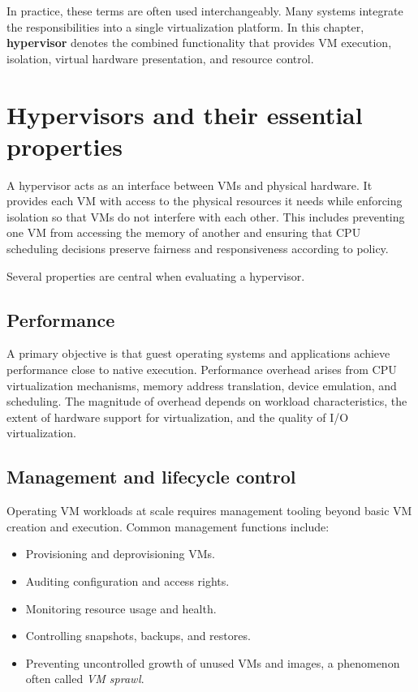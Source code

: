 \documentclass[11pt,a4paper,openany]{report}
\begin{document}
In practice, these terms are often used interchangeably. Many systems integrate the responsibilities into a single virtualization platform. In this chapter, \textbf{hypervisor} denotes the combined functionality that provides VM execution, isolation, virtual hardware presentation, and resource control.

\section{Hypervisors and their essential properties}

A hypervisor acts as an interface between VMs and physical hardware. It provides each VM with access to the physical resources it needs while enforcing isolation so that VMs do not interfere with each other. This includes preventing one VM from accessing the memory of another and ensuring that CPU scheduling decisions preserve fairness and responsiveness according to policy.

Several properties are central when evaluating a hypervisor.

\subsection{Performance}

A primary objective is that guest operating systems and applications achieve performance close to native execution. Performance overhead arises from CPU virtualization mechanisms, memory address translation, device emulation, and scheduling. The magnitude of overhead depends on workload characteristics, the extent of hardware support for virtualization, and the quality of I/O virtualization.

\subsection{Management and lifecycle control}

Operating VM workloads at scale requires management tooling beyond basic VM creation and execution. Common management functions include:

\begin{itemize}
\item Provisioning and deprovisioning VMs.
\item Auditing configuration and access rights.
\item Monitoring resource usage and health.
\item Controlling snapshots, backups, and restores.
\item Preventing uncontrolled growth of unused VMs and images, a phenomenon often called \emph{VM sprawl}.
\end{itemize}
\end{document}
